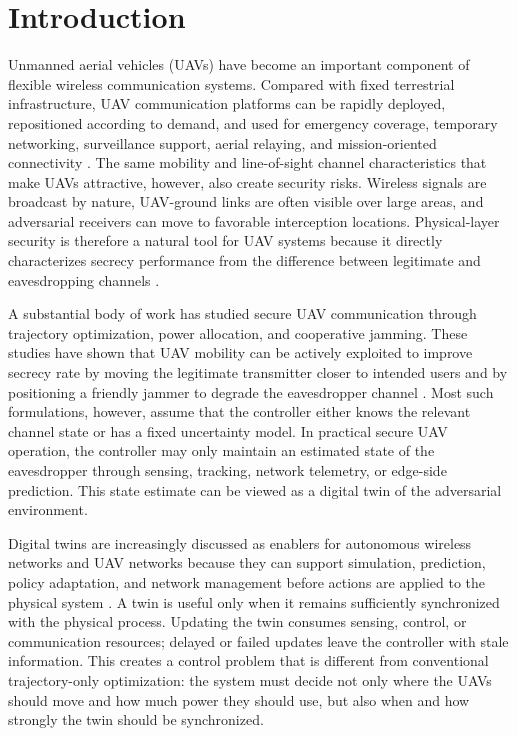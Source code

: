 \section{Introduction}
\label{sec:introduction}

Unmanned aerial vehicles (UAVs) have become an important component of flexible wireless communication systems. Compared with fixed terrestrial infrastructure, UAV communication platforms can be rapidly deployed, repositioned according to demand, and used for emergency coverage, temporary networking, surveillance support, aerial relaying, and mission-oriented connectivity \cite{zeng2016uav,mozaffari2019tutorial}. The same mobility and line-of-sight channel characteristics that make UAVs attractive, however, also create security risks. Wireless signals are broadcast by nature, UAV-ground links are often visible over large areas, and adversarial receivers can move to favorable interception locations. Physical-layer security is therefore a natural tool for UAV systems because it directly characterizes secrecy performance from the difference between legitimate and eavesdropping channels \cite{wyner1975wiretap,csiszar1978broadcast}.

A substantial body of work has studied secure UAV communication through trajectory optimization, power allocation, and cooperative jamming. These studies have shown that UAV mobility can be actively exploited to improve secrecy rate by moving the legitimate transmitter closer to intended users and by positioning a friendly jammer to degrade the eavesdropper channel \cite{zhang2019securing,zhong2019cooperative,zhou2018unknown,sun2019aerial}. Most such formulations, however, assume that the controller either knows the relevant channel state or has a fixed uncertainty model. In practical secure UAV operation, the controller may only maintain an estimated state of the eavesdropper through sensing, tracking, network telemetry, or edge-side prediction. This state estimate can be viewed as a digital twin of the adversarial environment.

Digital twins are increasingly discussed as enablers for autonomous wireless networks and UAV networks because they can support simulation, prediction, policy adaptation, and network management before actions are applied to the physical system \cite{kuruvatti2022digital,mcmanus2023digital}. A twin is useful only when it remains sufficiently synchronized with the physical process. Updating the twin consumes sensing, control, or communication resources; delayed or failed updates leave the controller with stale information. This creates a control problem that is different from conventional trajectory-only optimization: the system must decide not only where the UAVs should move and how much power they should use, but also when and how strongly the twin should be synchronized.

